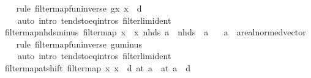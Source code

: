 \begin{isabellebody}
%
\isadelimproof
\ \ %
\endisadelimproof
%
\isatagproof
{}\isamarkupfalse%
\ {\isacharparenleft}{\kern0pt}rule\ filtermap{\isacharunderscore}{\kern0pt}fun{\isacharunderscore}{\kern0pt}inverse{\isacharbrackleft}{\kern0pt}\ g{\isacharequal}{\kern0pt}{\isachardoublequoteopen}{\isasymlambda}x{\isachardot}{\kern0pt}\ x\ {\isacharplus}{\kern0pt}\ d{\isachardoublequoteclose}{\isacharbrackright}{\kern0pt}{\isacharparenright}{\kern0pt}\isanewline
\ \ \ \ {\isacharparenleft}{\kern0pt}auto\ intro{\isacharbang}{\kern0pt}{\isacharcolon}{\kern0pt}\ tendsto{\isacharunderscore}{\kern0pt}eq{\isacharunderscore}{\kern0pt}intros\ filterlim{\isacharunderscore}{\kern0pt}ident{\isacharparenright}{\kern0pt}%
\endisatagproof
{\isafoldproof}%
%
\isadelimproof
\isanewline
%
\endisadelimproof
\isanewline
{}\isamarkupfalse%
\ filtermap{\isacharunderscore}{\kern0pt}nhds{\isacharunderscore}{\kern0pt}minus{\isacharcolon}{\kern0pt}\ {\isachardoublequoteopen}filtermap\ {\isacharparenleft}{\kern0pt}{\isasymlambda}x{\isachardot}{\kern0pt}\ {\isacharminus}{\kern0pt}\ x{\isacharparenright}{\kern0pt}\ {\isacharparenleft}{\kern0pt}nhds\ a{\isacharparenright}{\kern0pt}\ {\isacharequal}{\kern0pt}\ nhds\ {\isacharparenleft}{\kern0pt}{\isacharminus}{\kern0pt}\ a{\isacharparenright}{\kern0pt}{\isachardoublequoteclose}\isanewline
\ \ \ a\ {\isacharcolon}{\kern0pt}{\isacharcolon}{\kern0pt}\ {\isachardoublequoteopen}{\isacharprime}{\kern0pt}a{\isacharcolon}{\kern0pt}{\isacharcolon}{\kern0pt}real{\isacharunderscore}{\kern0pt}normed{\isacharunderscore}{\kern0pt}vector{\isachardoublequoteclose}\isanewline
%
\isadelimproof
\ \ %
\endisadelimproof
%
\isatagproof
{}\isamarkupfalse%
\ {\isacharparenleft}{\kern0pt}rule\ filtermap{\isacharunderscore}{\kern0pt}fun{\isacharunderscore}{\kern0pt}inverse{\isacharbrackleft}{\kern0pt}\ g{\isacharequal}{\kern0pt}uminus{\isacharbrackright}{\kern0pt}{\isacharparenright}{\kern0pt}\isanewline
\ \ \ \ {\isacharparenleft}{\kern0pt}auto\ intro{\isacharbang}{\kern0pt}{\isacharcolon}{\kern0pt}\ tendsto{\isacharunderscore}{\kern0pt}eq{\isacharunderscore}{\kern0pt}intros\ filterlim{\isacharunderscore}{\kern0pt}ident{\isacharparenright}{\kern0pt}%
\endisatagproof
{\isafoldproof}%
%
\isadelimproof
\isanewline
%
\endisadelimproof
\isanewline
{}\isamarkupfalse%
\ filtermap{\isacharunderscore}{\kern0pt}at{\isacharunderscore}{\kern0pt}shift{\isacharcolon}{\kern0pt}\ {\isachardoublequoteopen}filtermap\ {\isacharparenleft}{\kern0pt}{\isasymlambda}x{\isachardot}{\kern0pt}\ x\ {\isacharminus}{\kern0pt}\ d{\isacharparenright}{\kern0pt}\ {\isacharparenleft}{\kern0pt}at\ a{\isacharparenright}{\kern0pt}\ {\isacharequal}{\kern0pt}\ at\ {\isacharparenleft}{\kern0pt}a\ {\isacharminus}{\kern0pt}\ d{\isacharparenright}{\kern0pt}{\isachardoublequoteclose}\isanewline

\end{isabellebody}
